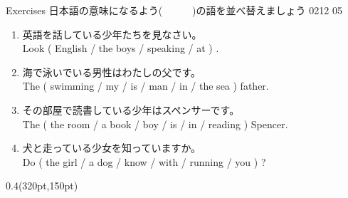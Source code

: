 \documentclass[aspectratio=169,xcolor={dvipsnames,table}]{beamer}
\begin{document}
\begin{frame}[plain]{Exercises}
  \hypertarget{EX}{}
  {\small 日本語の意味になるよう(~~~~~~)の語を並べ替えましょう}%
  \hfill{\tiny 0212}\,{\scriptsize {}}\,{\tiny 05}
  \begin{enumerate}
    \item  {\small 英語を話している少年たちを見なさい。}%
          \hfill\hyperlink{ZUKAI}{}\\%
          Look ( English / the boys / speaking / at ) .\\
    \item  {\small 海で泳いでいる男性はわたしの父です。}\\
          The ( swimming / my / is / man / in / the sea ) father.\\
    \item  {\small その部屋で読書している少年はスペンサーです。}\\
          The ( the room / a book / boy / is / in / reading ) Spencer.\\
    \item  {\small 犬と走っている少女を知っていますか。}\\
          Do ( the girl / a dog / know / with / running  / you ) ?\\
  \end{enumerate}

  \begin{textblock*}{0.4\linewidth}(320pt,150pt)
  \end{textblock*}
\end{frame}
\end{document}
